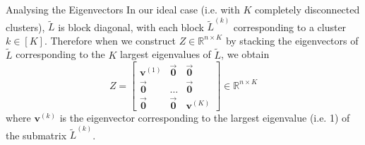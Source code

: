 \documentclass[aspectratio=169]{beamer}
\begin{document}
\begin{frame}{Analysing the Eigenvectors}
  In our ideal case (i.e. with $K$ completely disconnected clusters), $\tilde{L}$ is block diagonal, with each block $\tilde{L}^{(k)}$ corresponding to a cluster $k \in [K]$.
  \pause
  Therefore when we construct $Z \in \mathbb{R}^{n \times K}$ by stacking the eigenvectors of $\tilde{L}$ corresponding to the $K$ largest eigenvalues of $\tilde{L}$, we obtain
  \[Z = \begin{bmatrix}
    \mathbf{v}^{(1)} & \overrightarrow{\mathbf{0}} &\overrightarrow{\mathbf{0}} \\
    \overrightarrow{\mathbf{0}}  & \hdots &  \overrightarrow{\mathbf{0}} \\
    \overrightarrow{\mathbf{0}} & \overrightarrow{\mathbf{0}} & \mathbf{v}^{(K)}
  \end{bmatrix} \in \mathbb{R}^{n \times K}\]
  where $\mathbf{v}^{(k)}$ is the eigenvector corresponding to the largest eigenvalue (i.e. 1) of the submatrix $\tilde{L}^{(k)}$.
  

\end{frame}
\end{document}
